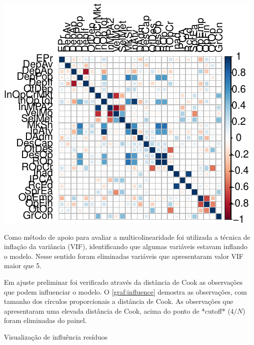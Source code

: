 \documentclass[
  12pt,
  12pt,
  openright,
  oneside,
  a4paper,
  chapter=TITLE,
  section=TITLE,
  subsection=TITLE,
  subsubsection=TITLE,
  portugues,
  sumario=tradicional]{abntex2}
\begin{document}
\begin{apendicesenv}
\begin{grafico}[!htbp]
\begin{center}\includegraphics{12-exportedfigures/chart.correlation-1} \end{center}
\vspace{-3mm}
\label{graf:corr}
\vspace{-2mm}
\end{grafico}

Como método de apoio para avaliar a multicolinearidade foi utilizada a técnica de inflação da variância (VIF), identificando que algumas variáveis estavam inflando o modelo. Nesse sentido foram eliminadas variáveis que apresentaram valor VIF maior que 5.

Em ajuste preliminar foi verificado através da distância de Cook as observações que podem influenciar o modelo. O \autoref{graf:influence} demostra as observações, com tamanho dos círculos proporcionais a distância de Cook. As observações que apresentaram uma elevada distância de Cook, acima do ponto de *cutoff*  ($4/N$) foram eliminadas do painel.    




\begin{grafico}[!htbp]
\vspace{20pt}
\caption{Visualização de influência resíduos}
\vspace{-4mm}


\end{grafico}
\end{apendicesenv}
\end{document}
